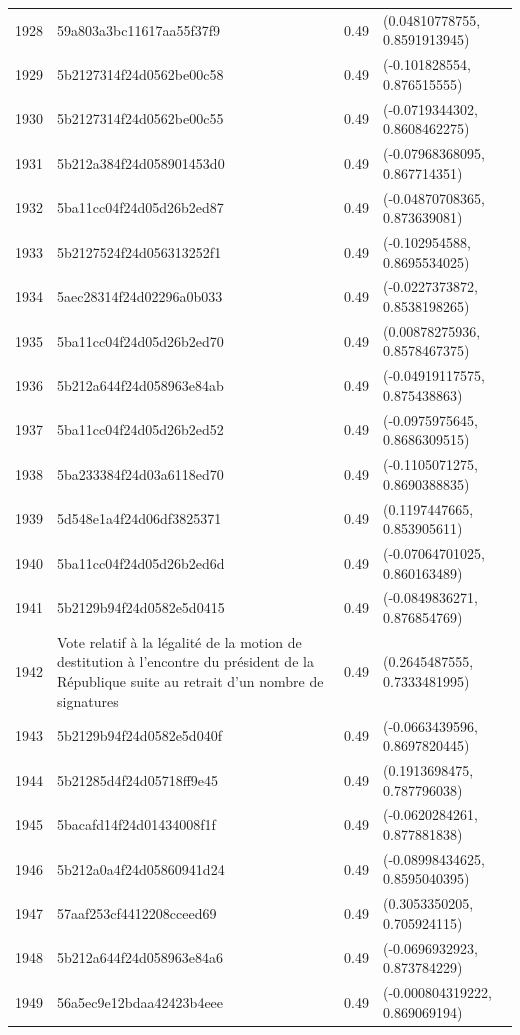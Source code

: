 \begin{table}[ht]
\begin{tabular}{rlrl}
  1928 & 59a803a3bc11617aa55f37f9 & 0.49 & (0.04810778755, 0.8591913945) \\ 
  1929 & 5b2127314f24d0562be00c58 & 0.49 & (-0.101828554, 0.876515555) \\ 
  1930 & 5b2127314f24d0562be00c55 & 0.49 & (-0.0719344302, 0.8608462275) \\ 
  1931 & 5b212a384f24d058901453d0 & 0.49 & (-0.07968368095, 0.867714351) \\ 
  1932 & 5ba11cc04f24d05d26b2ed87 & 0.49 & (-0.04870708365, 0.873639081) \\ 
  1933 & 5b2127524f24d056313252f1 & 0.49 & (-0.102954588, 0.8695534025) \\ 
  1934 & 5aec28314f24d02296a0b033 & 0.49 & (-0.0227373872, 0.8538198265) \\ 
  1935 & 5ba11cc04f24d05d26b2ed70 & 0.49 & (0.00878275936, 0.8578467375) \\ 
  1936 & 5b212a644f24d058963e84ab & 0.49 & (-0.04919117575, 0.875438863) \\ 
  1937 & 5ba11cc04f24d05d26b2ed52 & 0.49 & (-0.0975975645, 0.8686309515) \\ 
  1938 & 5ba233384f24d03a6118ed70 & 0.49 & (-0.1105071275, 0.8690388835) \\ 
  1939 & 5d548e1a4f24d06df3825371 & 0.49 & (0.1197447665, 0.853905611) \\ 
  1940 & 5ba11cc04f24d05d26b2ed6d & 0.49 & (-0.07064701025, 0.860163489) \\ 
  1941 & 5b2129b94f24d0582e5d0415 & 0.49 & (-0.0849836271, 0.876854769) \\ 
  1942 & Vote relatif à la légalité de la motion de destitution à l'encontre du président de la République suite au retrait d'un nombre de signatures & 0.49 & (0.2645487555, 0.7333481995) \\ 
  1943 & 5b2129b94f24d0582e5d040f & 0.49 & (-0.0663439596, 0.8697820445) \\ 
  1944 & 5b21285d4f24d05718ff9e45 & 0.49 & (0.1913698475, 0.787796038) \\ 
  1945 & 5bacafd14f24d01434008f1f & 0.49 & (-0.0620284261, 0.877881838) \\ 
  1946 & 5b212a0a4f24d05860941d24 & 0.49 & (-0.08998434625, 0.8595040395) \\ 
  1947 & 57aaf253cf4412208cceed69 & 0.49 & (0.3053350205, 0.705924115) \\ 
  1948 & 5b212a644f24d058963e84a6 & 0.49 & (-0.0696932923, 0.873784229) \\ 
  1949 & 56a5ec9e12bdaa42423b4eee & 0.49 & (-0.000804319222, 0.869069194) \\ 

\end{tabular}
\end{table}

